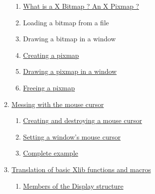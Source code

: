 \documentclass[12pt,oneside,titlepage]{book}
\providecommand{\tightlist}{%
  \setlength{\itemsep}{0pt}\setlength{\parskip}{0pt}}
\begin{document}
\begin{enumerate}
  \begin{enumerate}
  \tightlist
  \item
    \protect\hyperlink{pixmapswhat}{What is a X Bitmap ? An X Pixmap ?}
  \item
    Loading a bitmap from a file
  \item
    Drawing a bitmap in a window
  \item
    \protect\hyperlink{pixmapscreate}{Creating a pixmap}
  \item
    \protect\hyperlink{pixmapsdraw}{Drawing a pixmap in a window}
  \item
    \protect\hyperlink{pixmapsfree}{Freeing a pixmap}
  \end{enumerate}
\item
  \protect\hyperlink{mousecursor}{Messing with the mouse cursor}

  \begin{enumerate}
  \tightlist
  \item
    \protect\hyperlink{mousecursorcreate}{Creating and destroying a
    mouse cursor}
  \item
    \protect\hyperlink{mousecursorset}{Setting a window's mouse cursor}
  \item
    \protect\hyperlink{mousecursorexample}{Complete example}
  \end{enumerate}
\item
  \protect\hyperlink{translation}{Translation of basic Xlib functions
  and macros}

  \begin{enumerate}
  \tightlist
  \item
    \protect\hyperlink{displaystructure}{Members of the Display
    structure}


\end{enumerate}
\end{enumerate}
\end{document}
